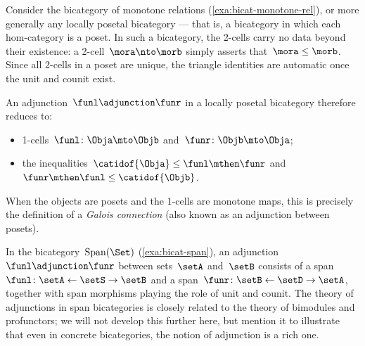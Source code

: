 \begin{example}
    \label{exa:bicat-adj-galois}
    Consider the bicategory of monotone relations (\cref{exa:bicat-monotone-rel}), or more generally any locally posetal bicategory --- that is, a bicategory in which each hom-category is a poset.
    In such a bicategory, the 2-cells carry no data beyond their existence: a 2-cell~$\mora \nto \morb$ simply asserts that~$\mora \leq \morb$.
    Since all 2-cells in a poset are unique, the triangle identities are automatic once the unit and counit exist.

    An adjunction~$\funl \adjunction \funr$ in a locally posetal bicategory therefore reduces to:
    \begin{itemize}
        \item 1-cells~$\funl \colon \Obja \mto \Objb$ and~$\funr \colon \Objb \mto \Obja$;
        \item the inequalities~$\catidof{\Obja} \leq \funl \mthen \funr$ and~$\funr \mthen \funl \leq \catidof{\Objb}$.
    \end{itemize}
    When the objects are posets and the 1-cells are monotone maps, this is precisely the definition of a \emph{Galois connection} (also known as an adjunction between posets).
\end{example}

\begin{example}
    \label{exa:bicat-adj-span}
    In the bicategory~$\operatorname{Span}(\Set)$ (\cref{exa:bicat-span}), an adjunction~$\funl \adjunction \funr$ between sets~$\setA$ and~$\setB$ consists of a span~$\funl \colon \setA \leftarrow \setS \rightarrow \setB$ and a span~$\funr \colon \setB \leftarrow \setD \rightarrow \setA$, together with span morphisms playing the role of unit and counit.
    The theory of adjunctions in span bicategories is closely related to the theory of bimodules and profunctors; we will not develop this further here, but mention it to illustrate that even in concrete bicategories, the notion of adjunction is a rich one.
\end{example}

